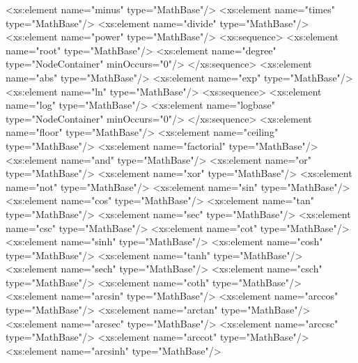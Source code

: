 \begin{example}
\begin{footnotesize}
                        <xs:element name="minus" type="MathBase"/>
                        <xs:element name="times" type="MathBase"/>
                        <xs:element name="divide" type="MathBase"/>
                        <xs:element name="power" type="MathBase"/>
                        <xs:sequence>
                            <xs:element name="root" type="MathBase"/>
                            <xs:element name="degree" type="NodeContainer" minOccurs="0"/>
                        </xs:sequence>
                        <xs:element name="abs" type="MathBase"/>
                        <xs:element name="exp" type="MathBase"/>
                        <xs:element name="ln" type="MathBase"/>
                        <xs:sequence>
                            <xs:element name="log" type="MathBase"/>
                            <xs:element name="logbase" type="NodeContainer" minOccurs="0"/>
                        </xs:sequence>
                        <xs:element name="floor" type="MathBase"/>
                        <xs:element name="ceiling" type="MathBase"/>
                        <xs:element name="factorial" type="MathBase"/>
                        <xs:element name="and" type="MathBase"/>
                        <xs:element name="or" type="MathBase"/>
                        <xs:element name="xor" type="MathBase"/>
                        <xs:element name="not" type="MathBase"/>
                        <xs:element name="sin" type="MathBase"/>
                        <xs:element name="cos" type="MathBase"/>
                        <xs:element name="tan" type="MathBase"/>
                        <xs:element name="sec" type="MathBase"/>
                        <xs:element name="csc" type="MathBase"/>
                        <xs:element name="cot" type="MathBase"/>
                        <xs:element name="sinh" type="MathBase"/>
                        <xs:element name="cosh" type="MathBase"/>
                        <xs:element name="tanh" type="MathBase"/>
                        <xs:element name="sech" type="MathBase"/>
                        <xs:element name="csch" type="MathBase"/>
                        <xs:element name="coth" type="MathBase"/>
                        <xs:element name="arcsin" type="MathBase"/>
                        <xs:element name="arccos" type="MathBase"/>
                        <xs:element name="arctan" type="MathBase"/>
                        <xs:element name="arcsec" type="MathBase"/>
                        <xs:element name="arccsc" type="MathBase"/>
                        <xs:element name="arccot" type="MathBase"/>
                        <xs:element name="arcsinh" type="MathBase"/>

\end{footnotesize}
\end{example}
